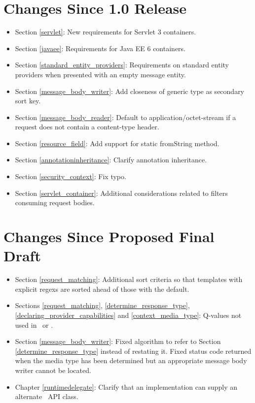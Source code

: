 \section{Changes Since 1.0 Release}

\begin{itemize}
\item Section \ref{servlet}: New requirements for Servlet 3 containers.
\item Section \ref{javaee}: Requirements for Java EE 6 containers.
\item Section \ref{standard_entity_providers}: Requirements on standard entity providers when presented with an empty message entity.
\item Section \ref{message_body_writer}: Add closeness of generic type as secondary sort key.
\item Section \ref{message_body_reader}: Default to application/octet-stream if a request does not contain a content-type header.
\item Section \ref{resource_field}: Add support for static fromString method.
\item Section \ref{annotationinheritance}: Clarify annotation inheritance.
\item Section \ref{security_context}: Fix typo.
\item Section \ref{servlet_container}: Additional considerations related to filters consuming request bodies.
\end{itemize}

\section{Changes Since Proposed Final Draft}

\begin{itemize}
\item Section \ref{request_matching}: Additional sort criteria so that templates with explicit regexs are sorted ahead of those with the default.
\item Sections \ref{request_matching}, \ref{determine_response_type}, \ref{declaring_provider_capabilities} and \ref{context_media_type}: Q-values not used in \Consumes\ or \Produces.
\item Section \ref{message_body_writer}: Fixed algorithm to refer to Section \ref{determine_response_type} instead of restating it. Fixed status code returned when the media type has been determined but an appropriate message body writer cannot be located.
\item Chapter \ref{runtimedelegate}: Clarify that an implementation can supply an alternate \rd\ API class.
\end{itemize}

